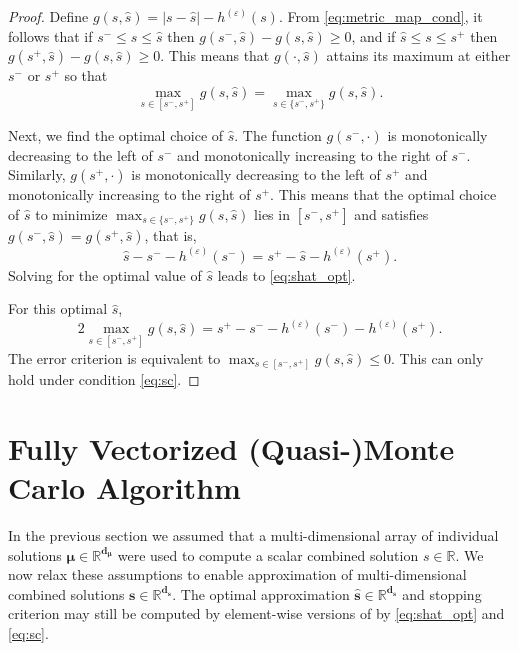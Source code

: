 \documentclass[graybox]{svmult}
\begin{document}
\begin{proof}
    Define $g(s,\hat{s})=\lvert s - \hat{s} \rvert -h^{(\varepsilon)}(s)$. From \eqref{eq:metric_map_cond}, it follows that if  $s^- \leq s \leq \hat{s}$ then $g(s^-,\hat{s})-g(s,\hat{s}) \geq 0$, and if $\hat{s} \leq s \leq s^+$ then $g(s^+,\hat{s})-g(s,\hat{s})  \geq 0$. This means that $g(\cdot,\hat{s})$ attains its maximum at either $s^-$ or $s^+$ so that
    \begin{equation*}
        \max_{s \in [s^-,s^+]} g(s,\hat{s}) = \max_{s \in \{s^-,s^+\}} g(s,\hat{s}).
    \end{equation*}
    
    Next, we find the optimal choice of $\hat{s}$.  The function $g(s^-,\cdot)$ is monotonically decreasing to the left of  $s^-$ and monotonically increasing to the right of $s^-$. Similarly, $g(s^+,\cdot)$ is monotonically decreasing to the left of $s^+$ and monotonically increasing to the right of $s^+$. This means that the optimal choice of $\hat{s}$ to minimize $\max_{s \in \{s^-,s^+\}} g(s,\hat{s})$ lies in $[s^-,s^+]$ and satisfies $g(s^-,\hat{s}) = g(s^+,\hat{s})$, that is, 
    $$\hat{s} - s^- - h^{(\varepsilon)}(s^-) = s^+ - \hat{s} - h^{(\varepsilon)}(s^+).$$
    Solving for the optimal value of $\hat{s}$ leads to \eqref{eq:shat_opt}.
    
    For this optimal $\hat{s}$, 
    $$2 \max_{s \in [s^-,s^+]} g(s,\hat{s}) =  s^+  -  s^-  - h^{(\varepsilon)}(s^-) - h^{(\varepsilon)}(s^+).$$
    The error criterion is equivalent to $\max_{s \in [s^-,s^+]} g(s,\hat{s}) \le 0 $.  This can only hold under condition  \eqref{eq:sc}. 
\end{proof}

\section{Fully Vectorized (Quasi-)Monte Carlo Algorithm} \label{sec: Vectorized Implementation}

In the previous section we assumed that a multi-dimensional array of individual solutions $\boldsymbol{\mu} \in \mathbb{R}^{\boldsymbol{d}_{\boldsymbol{\mu}}}$ were used to compute a scalar combined solution $s \in \mathbb{R}$. We now relax these assumptions to enable approximation of multi-dimensional combined solutions $\boldsymbol{s} \in \mathbb{R}^{\boldsymbol{d}_{\boldsymbol{s}}}$. The optimal approximation $\hat{\boldsymbol{s}} \in \mathbb{R}^{\boldsymbol{d}_{\boldsymbol{s}}}$ and stopping criterion may still be computed by element-wise versions of by \eqref{eq:shat_opt} and \eqref{eq:sc}. 
\end{document}
